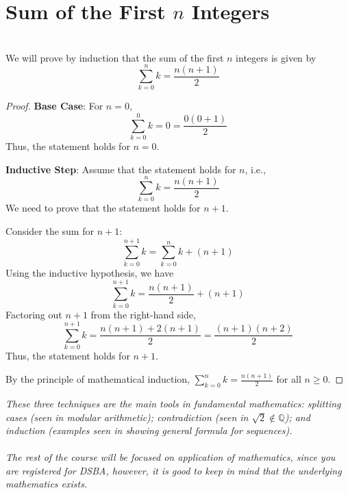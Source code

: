 \documentclass[]{article}
\newcommand{\Q}{\mathbb{Q}}
\begin{document}
	\section*{Sum of the First $n$ Integers}
	\noindent\\
	We will prove by induction that the sum of the first $n$ integers is given by
	$$ \sum_{k=0}^n k = \frac{n(n+1)}{2} $$
	\begin{proof}
		\textbf{Base Case}:
		For $n = 0$,
		$$ \sum_{k=0}^0 k = 0 = \frac{0(0+1)}{2} $$
		Thus, the statement holds for $n = 0$.
		
		\textbf{Inductive Step}:
		Assume that the statement holds for $n$, i.e.,
		$$ \sum_{k=0}^n k = \frac{n(n+1)}{2} $$
		We need to prove that the statement holds for $n + 1$.
		
		Consider the sum for $n + 1$:
		$$ \sum_{k=0}^{n+1} k = \sum_{k=0}^n k + (n+1) $$
		Using the inductive hypothesis, we have
		$$ \sum_{k=0}^{n+1} k = \frac{n(n+1)}{2} + (n+1) $$
		Factoring out $n+1$ from the right-hand side,
		$$ \sum_{k=0}^{n+1} k = \frac{n(n+1) + 2(n+1)}{2} = \frac{(n+1)(n+2)}{2} $$
		Thus, the statement holds for $n + 1$.
		
		By the principle of mathematical induction, $\sum_{k=0}^n k = \frac{n(n+1)}{2}$ for all $n \geq 0$.
	\end{proof}
	
	\vspace{5cm}
	\textit{
		These three techniques are the main tools in fundamental mathematics:
		splitting cases (seen in modular arithmetic); contradiction (seen in $\sqrt{2} \not \in \Q$); and induction (examples seen in showing general formula for sequences).
		\\\\
		The rest of the course will be focused on application of mathematics, since you are registered for DSBA, however, it is good to keep in mind that the underlying mathematics exists.
	}
	
\end{document}
